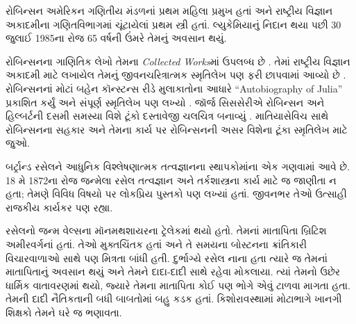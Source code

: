 રોબિન્સન અમેરિકન
ગણિતીય મંડળનાં
પ્રથમ મહિલા પ્રમુખ
હતાં અને રાષ્ટ્રીય
વિજ્ઞાન અકાદમીના ગણિતવિભાગમાં
ચૂંટાયેલાં પ્રથમ
સ્ત્રી હતાં.
લ્યુકેમિયાનું નિદાન
થયા પછી 30 જુલાઈ
1985ના રોજ 65
વર્ષની ઉંમરે
તેમનું અવસાન થયું.


\begin{reading}
રોબિન્સનના ગાણિતિક
લેખો તેમના
\textit{Collected
  Works}માં ઉપલબ્ધ છે
\citep{Robinson1996}.
તેમાં રાષ્ટ્રીય વિજ્ઞાન
અકાદમી માટે લખાયેલ
તેમનું જીવનચરિત્રાત્મક
સ્મૃતિલેખ પણ ફરી
છાપવામાં આવ્યો છે
\citep{Feferman1994}.
રોબિન્સનનાં મોટાં
બહેન કૉન્સ્ટન્સ રીડે
મુલાકાતોના આધારે
“Autobiography of Julia”
પ્રકાશિત કર્યું
\citep{Reid1986}
અને સંપૂર્ણ
સ્મૃતિલેખ પણ લખ્યો
\citep{Reid1996}.
જૉર્જ સિસસેરીએ
રોબિન્સન અને
હિલ્બર્ટની દસમી
સમસ્યા વિશે ટૂંકો
દસ્તાવેજી ચલચિત્ર
બનાવ્યું
\citep{Csicsery2016}.
માતિયાસેવિચ સાથે
રોબિન્સનના સહકાર
અને તેમના કાર્ય પર
રોબિન્સનની અસર
વિશેના ટૂંકા
સ્મૃતિલેખ માટે
\citep{Matijasevich1992}
જુઓ.
\end{reading}
\endgroup


\begingroup
\makeatletter{}\makeatother


\label{guunit:OLP-0629}





બર્ટ્રાન્ડ રસેલને આધુનિક
વિશ્લેષણાત્મક તત્વજ્ઞાનના
સ્થાપકોમાંના એક ગણવામાં
આવે છે. 18 મે 1872ના રોજ
જન્મેલા રસેલ તત્વજ્ઞાન અને
તર્કશાસ્ત્રના કાર્ય માટે
જ જાણીતા ન હતા; તેમણે
વિવિધ વિષયો પર લોકપ્રિય
પુસ્તકો પણ લખ્યાં હતાં.
જીવનભર તેઓ ઉત્સાહી
રાજકીય કાર્યકર પણ રહ્યા.

રસેલનો જન્મ વેલ્સના
મૉનમથશાયરના ટ્રેલેકમાં
થયો હતો. તેમનાં માતાપિતા
બ્રિટિશ અમીરવર્ગનાં હતાં.
તેઓ મુક્તચિંતક હતાં અને
તે સમયના બોસ્ટનના
ક્રાંતિકારી વિચારવાળાઓ
સાથે પણ મિત્રતા બાંધી
હતી. દુર્ભાગ્યે રસેલ
નાના હતા ત્યારે જ
તેમનાં માતાપિતાનું
અવસાન થયું અને
તેમને દાદા-દાદી
સાથે રહેવા મોકલાયા.
ત્યાં તેમનો ઉછેર
ધાર્મિક વાતાવરણમાં
થયો, જ્યારે તેમના
માતાપિતા કોઈ પણ
ભોગે એવું ટાળવા
માગતા હતા. તેમની
દાદી નૈતિકતાની
બધી બાબતોમાં બહુ
કડક હતાં. કિશોરાવસ્થામાં
મોટાભાગે ખાનગી
શિક્ષકો તેમને ઘરે
જ ભણાવતા.

